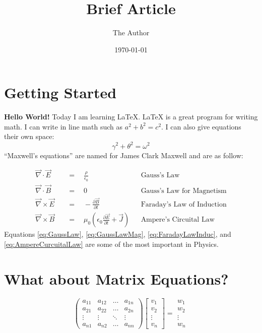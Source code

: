\documentclass{article}   	%
\title{Brief Article}
\author{The Author}
\date{\today}							%
\begin{document}
    \maketitle

    \section{Getting Started}

    \textbf{Hello World!} Today I am learning \LaTeX. \LaTeX{} is a great program for writing math. I can write in line math such as $a^2 + b^2 = c^2$. I can also give equations their own space:
    \begin{equation}
        \gamma ^ 2 + \theta^2=\omega ^2
    \end{equation}
    ``Maxwell's equations'' are named for James Clark Maxwell and are as follow:

    \begin{align}
        \vec{\nabla}\cdot\vec{E} & \quad=\quad\frac{\rho}{\epsilon_0} && \text{Gauss's Law}
        \label{eq:GaussLaw}
        \\
        \vec{\nabla}\cdot\vec{B} &\quad=\quad0 && \text{Gauss's Law for Magnetism}
        \label{eq:GaussLawMag}
        \\
        \vec{\nabla}\times\vec{E} & \quad=\quad -\frac{\partial\vec{B}}{\partial t} && \text{Faraday's Law of Induction}
        \label{eq:FaradayLawInduc}
        \\
        \vec{\nabla}\times\vec{B} & \quad=\quad \mu_0 \left(\epsilon_0\frac{\partial\vec{E}}{\partial t}+\vec{J}\right) && \text{Ampere's Circuital Law}
        \label{eq:AmpereCurcuitalLaw}
    \end{align}
    Equations \ref{eq:GaussLaw}, \ref{eq:GaussLawMag}, \ref{eq:FaradayLawInduc}, and \ref{eq:AmpereCurcuitalLaw} are some of the most important in Physics.

    \section{What about Matrix Equations?}
    \begin{equation*}
        \begin{pmatrix}
            a_{11} & a_{12} & \dots & a_{1n} \\
            a_{21} & a_{22} & \dots & a_{2n} \\
            \vdots & \vdots & \ddots & \vdots \\
            a_{n1} & a_{n2} & \dots & a_{nn}
        \end{pmatrix}
        \begin{bmatrix}
            v_1 \\ v_2 \\ \vdots \\ v_n
        \end{bmatrix}
        =
        \begin{matrix}
            w_1 \\ w_2 \\ \vdots \\ w_n
        \end{matrix}
    \end{equation*}
\end{document}
